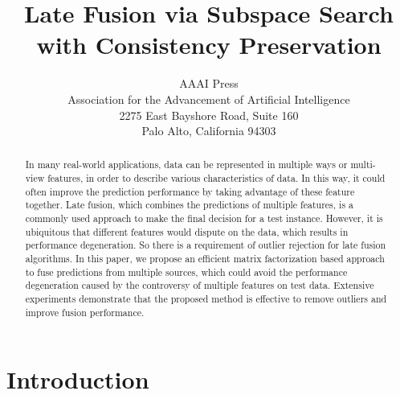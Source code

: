 \documentclass[letterpaper]{article}
\begin{document}
%



\title{Late Fusion via Subspace Search with Consistency Preservation}

\author{AAAI Press\\
Association for the Advancement of Artificial Intelligence\\
2275 East Bayshore Road, Suite 160\\
Palo Alto, California 94303\\
}

\maketitle



\begin{abstract}
In many real-world applications, data can be represented in multiple ways or multi-view features,
in order to describe various characteristics of data.
In this way, it could often improve the prediction performance by taking advantage of these feature together.
Late fusion, which combines the predictions of multiple features, is a commonly used approach to make the final decision for a test instance.
However, it is ubiquitous that different features would dispute on the data, which results in performance degeneration.
So there is a requirement of outlier rejection for late fusion algorithms.
In this paper, we propose an efficient matrix factorization based approach to fuse predictions from multiple sources,
which could avoid the performance degeneration caused by the controversy of multiple features on test data.
Extensive experiments demonstrate that the proposed method is effective to remove outliers and improve fusion performance.

\end{abstract}




\section{Introduction}
\end{document}

